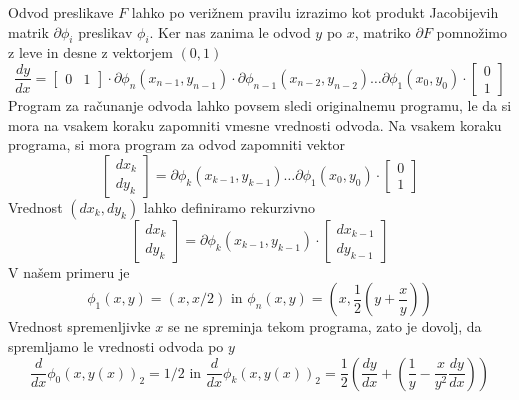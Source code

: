 \documentclass{article}
\newcommand{\D}{\partial}
\begin{document}
Odvod preslikave $F$ lahko po verižnem pravilu izrazimo kot produkt Jacobijevih matrik
$\D\phi_i$ preslikav $\phi_i$. Ker nas zanima le odvod $y$ po $x$, matriko $\D F$
pomnožimo z leve in desne z vektorjem $(0,1)$ 
\begin{equation}
\label{eq:kompozitum}
  \frac{dy}{dx} =
  \begin{bmatrix}
    0& 1
  \end{bmatrix}
\cdot \D\phi_n(x_{n-1},y_{n-1})\cdot \D\phi_{n-1}(x_{n-2},y_{n-2})\ldots \D\phi_1(x_0,y_0)\cdot
  \begin{bmatrix}
    0\\
    1
  \end{bmatrix} 
\end{equation}
Program za računanje odvoda lahko povsem sledi originalnemu programu, le da si
mora na vsakem koraku zapomniti vmesne vrednosti odvoda. Na vsakem
koraku programa, si mora program za odvod zapomniti vektor
\begin{equation*}
\begin{bmatrix}dx_{k}\\dy_{k}\end{bmatrix} = \D\phi_{k}(x_{k-1},y_{k-1})\ldots \D\phi_1(x_0,y_0)\cdot \begin{bmatrix} 0\\ 1\end{bmatrix} 
\end{equation*}
Vrednost $(dx_k,dy_k)$ lahko definiramo rekurzivno
\begin{equation}
  \label{eq:rek_odvod}
\begin{bmatrix}dx_{k}\\dy_{k}\end{bmatrix} = \D\phi_{k}(x_{k-1},y_{k-1})\cdot \begin{bmatrix} dx_{k-1}\\ dy_{k-1}\end{bmatrix} 
\end{equation}
V našem primeru je 
\begin{equation*}
  \phi_1(x,y)=(x,x/2)\text{ in } \phi_n(x,y)=\left(x,\frac{1}{2}\left( y+\frac{x}{y} \right)\right)
\end{equation*}
Vrednost spremenljivke $x$ se ne spreminja tekom programa, zato je dovolj, da
spremljamo le vrednosti odvoda po $y$
\begin{equation*}
  \frac{d}{dx}\phi_0(x,y(x))_2=1/2\text{ in }\frac{d}{dx}\phi_k(x,y(x))_2=\frac{1}{2}\left( \frac{dy}{dx}+\left(\frac{1}{y}-\frac{x}{y^2}\frac{dy}{dx}\right) \right)
\end{equation*}
 
\end{document}
